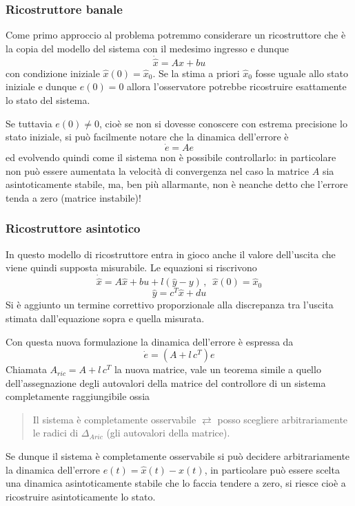 \documentclass[a4paper]{article}
\begin{document}
	\subsubsection{Ricostruttore banale}
	Come primo approccio al problema potremmo considerare un ricostruttore che è la copia del modello del sistema con il medesimo ingresso e dunque 
	\[\dot{\hat{x}}=A\hat{x}+bu\]
	con condizione iniziale $\hat{x}(0)=\hat{x}_0$. Se la stima a priori $\hat{x}_0$ fosse uguale allo stato iniziale e dunque $e(0)=0$ allora l'osservatore potrebbe ricostruire esattamente lo stato del sistema.
	
	Se tuttavia $e(0)\ne0$, cioè se non si dovesse conoscere con estrema precisione lo stato iniziale, si può facilmente notare che la dinamica dell'errore è \[\dot{e}=Ae\] ed evolvendo quindi come il sistema non è possibile controllarlo: in particolare non può essere aumentata la velocità di convergenza nel caso la matrice $A$ sia asintoticamente stabile, ma, ben più allarmante, non è neanche detto che l'errore tenda a zero (matrice instabile)!
	
	\subsubsection{Ricostruttore asintotico}
	In questo modello di ricostruttore entra in gioco anche il valore dell'uscita che viene quindi supposta misurabile. Le equazioni si  riscrivono
	\[\dot{\hat{x}}=A\hat{x}+bu+l(\hat{y}-y)\,,\,\,\,\hat{x}(0)=\hat{x}_0\]
	\[\hat{y}=c^T\hat{x}+du\]
	Si è aggiunto un termine correttivo	proporzionale alla discrepanza tra l'uscita stimata dall'equazione sopra e quella misurata.
	
	Con questa nuova formulazione la dinamica dell'errore è espressa da \[\dot{e}=(A+l\,c^T)e\]
	Chiamata $A_{ric}=A+l\,c^T$ la nuova matrice, vale un teorema simile a quello dell'assegnazione degli autovalori della matrice del controllore di un sistema completamente raggiungibile ossia 
	\begin{quote}
		Il sistema è completamente osservabile $\rightleftarrows$ posso scegliere arbitrariamente le radici di $\Delta_{Aric}$ (gli autovalori della matrice).
	\end{quote} 
	Se dunque il sistema è completamente osservabile si può decidere arbitrariamente la dinamica dell'errore $e(t)=\hat{x}(t)-x(t)$, in particolare può essere scelta una dinamica asintoticamente stabile che lo faccia tendere a zero, si riesce cioè a ricostruire asintoticamente lo stato.
	
\end{document}
